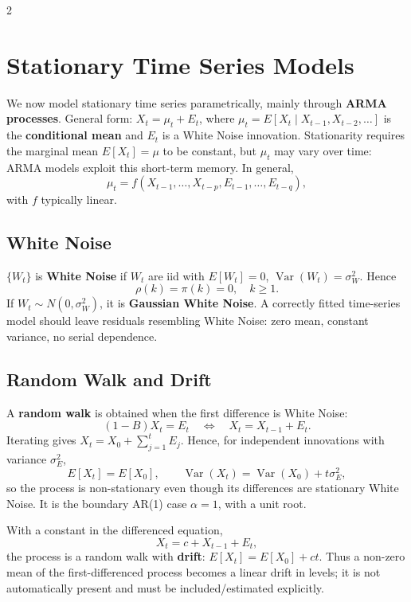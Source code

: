 \documentclass[9pt,a4paper]{extarticle}
\newcommand{\key}[1]{\textbf{#1}}
\begin{document}
\begin{multicols}{2}
\raggedcolumns

\section{Stationary Time Series Models}

We now model stationary time series parametrically, mainly through \key{ARMA processes}. General form: \(X_t=\mu_t+E_t\), where \(\mu_t=E[X_t\mid X_{t-1},X_{t-2},\ldots]\) is the \key{conditional mean} and \(E_t\) is a White Noise innovation. Stationarity requires the marginal mean \(E[X_t]=\mu\) to be constant, but \(\mu_t\) may vary over time: ARMA models exploit this short-term memory. In general,
\[
\mu_t=f(X_{t-1},\ldots,X_{t-p},E_{t-1},\ldots,E_{t-q}),
\]
with \(f\) typically linear.

\subsection{White Noise}

\(\{W_t\}\) is \key{White Noise} if \(W_t\) are iid with \(E[W_t]=0\), \(\operatorname{Var}(W_t)=\sigma_W^2\). Hence
\[
\boxed{\rho(k)=\pi(k)=0,\quad k\ge1.}
\]
If \(W_t\sim N(0,\sigma_W^2)\), it is \key{Gaussian White Noise}. A correctly fitted time-series model should leave residuals resembling White Noise: zero mean, constant variance, no serial dependence.

\subsection{Random Walk and Drift}

A \key{random walk} is obtained when the first difference is White Noise:
\[
\boxed{(1-B)X_t=E_t\quad\Longleftrightarrow\quad X_t=X_{t-1}+E_t.}
\]
Iterating gives \(X_t=X_0+\sum_{j=1}^tE_j\). Hence, for independent innovations with variance \(\sigma_E^2\),
\[
E[X_t]=E[X_0],\qquad
\operatorname{Var}(X_t)=\operatorname{Var}(X_0)+t\sigma_E^2,
\]
so the process is non-stationary even though its differences are stationary White Noise. It is the boundary AR(1) case \(\alpha=1\), with a unit root.

With a constant in the differenced equation,
\[
\boxed{X_t=c+X_{t-1}+E_t,}
\]
the process is a random walk with \key{drift}: \(E[X_t]=E[X_0]+ct\). Thus a non-zero mean of the first-differenced process becomes a linear drift in levels; it is not automatically present and must be included/estimated explicitly.


\end{multicols}
\end{document}
